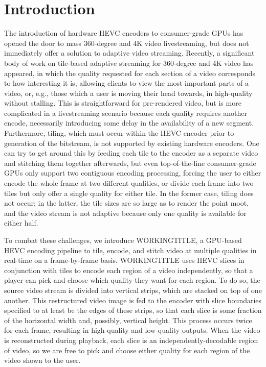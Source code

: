 \section{Introduction}
The introduction of hardware HEVC encoders to consumer-grade GPUs has opened the door to mass 360-degree and 4K video livestreaming, but does not immediately offer a solution to adaptive video streaming. Recently, a significant body of work on tile-based adaptive streaming for 360-degree and 4K video has appeared, in which the quality requested for each section of a video corresponds to how interesting it is, allowing clients to view the most important parts of a video, or, e.g., those which a user is moving their head towards, in high-quality without stalling. This is straightforward for pre-rendered video, but is more complicated in a livestreaming scenario because each quality requires another encode, necessarily introducing some delay in the availability of a new segment. Furthermore, tiling, which must occur within the HEVC encoder prior to generation of the bitstream, is not supported by existing hardware encoders. One can try to get around this by feeding each tile to the encoder as a separate video and stitching them together afterwards, but even top-of-the-line consumer-grade GPUs only support two contiguous encoding processing, forcing the user to either encode the whole frame at two different qualities, or divide each frame into two tiles but only offer a single quality for either tile. In the former case, tiling does not occur; in the latter, the tile sizes are so large as to render the point moot, and the video stream is not adaptive because only one quality is available for either half.

To combat these challenges, we introduce WORKINGTITLE, a GPU-based HEVC encoding pipeline to tile, encode, and stitch video at multiple qualities in real-time on a frame-by-frame basis. WORKINGTITLE uses HEVC slices in conjunction with tiles to encode each region of a video independently, so that a player can pick and choose which quality they want for each region. To do so, the source video stream is divided into vertical strips, which are stacked on top of one another. This restructured video image is fed to the encoder with slice boundaries specified to at least be the edges of these strips, so that each slice is some fraction of the horizontal width and, possibly, vertical height. This process occurs twice for each frame, resulting in high-quality and low-quality outputs. When the video is reconstructed during playback, each slice is an independently-decodable region of video, so we are free to pick and choose either quality for each region of the video shown to the user.

